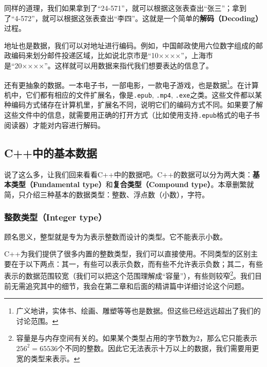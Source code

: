 同样的道理，我们如果拿到了``24-571''，就可以根据这张表查出``张三''；拿到了``4-572''，就可以根据这张表查出``李四''。这就是一个简单的\textbf{解码（Decoding）}过程。\par
地址也是数据，我们可以对地址进行编码。例如，中国邮政使用六位数字组成的邮政编码来划分邮件投递区域，比如说北京市是``10××××''，上海市是``20××××''。这样就可以用数据来指代我们想要表达的信息了。\par
还有更抽象的数据。一本电子书，一部电影，一款电子游戏，也是数据\footnote{广义地讲，实体书、绘画、雕塑等等也是数据。但这些已经远远超出了我们的讨论范围。}。在计算机中，它们都有相应的文件扩展名，像是\texttt{.epub}, \texttt{.mp4}, \texttt{.exe}之类。这些文件都以某种编码方式储存在计算机里，扩展名不同，说明它们的编码方式不同。如果要了解这些文件中的信息，就需要用正确的打开方式（比如使用支持\texttt{.epub}格式的电子书阅读器）才能对内容进行解码。\par
\subsection*{C++中的基本数据}
说了这么多，让我们回来看看C++中的数据吧。C++的数据可以分为两大类：\textbf{基本类型（Fundamental type）}和\textbf{复合类型（Compound type）}。本章删繁就简，只介绍三种基本的数据类型：整数、浮点数（小数），字符。\par
\subsubsection*{整数类型（Integer type）}
顾名思义，整型就是专为为表示整数而设计的类型。它不能表示小数。\par
C++为我们提供了很多内置的整数类型，我们可以直接使用。不同类型的区别主要在于以下两点：其一，有些可以表示负数，而有些不允许表示负数；其二，有些表示的数据范围较宽（我们可以把这个范围理解成``容量''），有些则较窄\footnote{容量是与内存空间有关的。如果某个类型占用的字节数为2，那么它只能表示$256^2=65536$个不同的整数。因此它无法表示十万以上的数据，我们需要用更宽的类型来表示。}。我们目前无需追究其中的细节，我会在第二章和后面的精讲篇中详细讨论这个问题。\par
